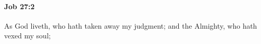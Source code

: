 
		\paragraph{Job 27:2} %
			\label{JOB-27-2}

			As God liveth, who hath taken away my judgment; and the Almighty, who hath vexed my soul;


